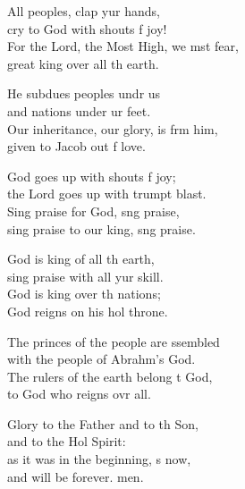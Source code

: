\begin{psalmverse}
  \begin{patverse}
    All peoples, clap yur hands,\Med\\
cry to God with shouts f joy!\\
For the Lord, the Most High, we mst fear,\Med\\
great king over all th earth.

He subdues peoples undr us\Med\\
and nations under ur feet.\\
Our inheritance, our glory, is frm him,\Med\\
given to Jacob out f love.

God goes up with shouts f joy;\Med\\
the Lord goes up with trumpt blast.\\
Sing praise for God, s\pointup{\i}ng praise,\Med\\
sing praise to our king, s\pointup{\i}ng praise.

God is king of all th earth,\Med\\
sing praise with all yur skill.\\
God is king over th nations;\Med\\
God reigns on his hol throne.

The princes of the people are ssembled\Med\\
with the people of Abrahm’s God.\\
The rulers of the earth belong t God,\Med\\
to God who reigns ovr all.

Glory to the Father and to th Son,\Med\\
and to the Hol Spirit:\\
as it was in the beginning, \pointup{\i}s now,\Med\\
and will be forever. men. 
  \end{patverse}
\end{psalmverse}

